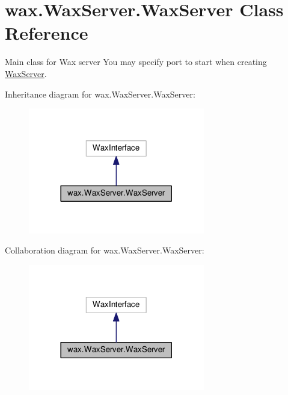 \hypertarget{classwax_1_1WaxServer_1_1WaxServer}{}\section{wax.\+Wax\+Server.\+Wax\+Server Class Reference}
\label{classwax_1_1WaxServer_1_1WaxServer}


Main class for Wax server You may specify port to start when creating \hyperlink{classwax_1_1WaxServer_1_1WaxServer}{Wax\+Server}.  




Inheritance diagram for wax.\+Wax\+Server.\+Wax\+Server\+:
\nopagebreak
\begin{figure}[H]
\begin{center}
\leavevmode
\includegraphics[width=218pt]{classwax_1_1WaxServer_1_1WaxServer__inherit__graph}
\end{center}
\end{figure}


Collaboration diagram for wax.\+Wax\+Server.\+Wax\+Server\+:
\nopagebreak
\begin{figure}[H]
\begin{center}
\leavevmode
\includegraphics[width=218pt]{classwax_1_1WaxServer_1_1WaxServer__coll__graph}
\end{center}
\end{figure}
